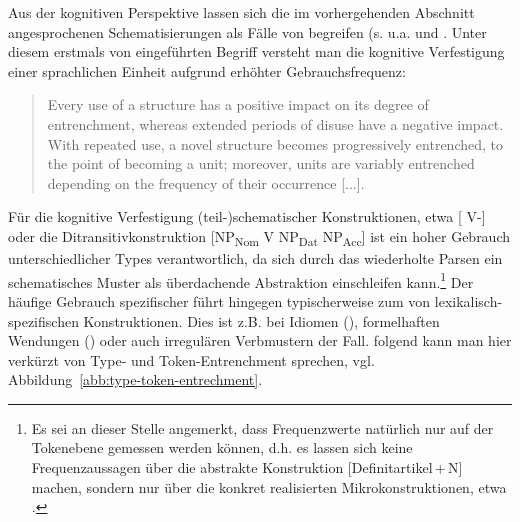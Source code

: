 \begin{sloppypar}Aus der kognitiven Perspektive lassen sich die im vorhergehenden Abschnitt angesprochenen Schematisierungen  als Fälle von  begreifen (s. u.a. \citealt{Langacker1987,Langacker2008,Goldberg1995,Goldberg2006,Bybee2006,Bybee2010} und \citealt{Schmid2007,Schmid2016}. 
Unter diesem erstmals von \citeauthor{Langacker1987} eingeführten Begriff versteht man die kognitive Verfestigung einer sprachlichen Einheit aufgrund erhöhter Gebrauchsfrequenz:\end{sloppypar}\blockcquote[59]{Langacker1987}{Every use of a structure has a positive impact on its degree of entrenchment, whereas extended periods of disuse have a negative impact. With repeated use, a novel structure becomes progressively entrenched, to the point of becoming a unit; moreover, units are variably entrenched depending on the frequency of their occurrence [...].} 

Für die kognitive Verfestigung (teil-)schematischer Konstruktionen, 
etwa [ V-] \parencite{Flick2016} oder  die Ditransitivkonstruktion   [NP\textsubscript{Nom} V NP\textsubscript{Dat} NP\textsubscript{Acc}] \parencite{Goldberg2006} ist ein hoher Gebrauch unterschiedlicher Types  verantwortlich, da sich durch das wiederholte Parsen ein schematisches Muster als überdachende Abstraktion einschleifen kann.\footnote{Es sei an dieser Stelle angemerkt, dass Frequenzwerte natürlich nur auf der Tokenebene  gemessen werden können, d.h. es lassen sich keine Frequenzaussagen über die abstrakte Konstruktion   [Definitartikel\,+\,N] machen, sondern nur über die konkret realisierten Mikrokonstruktionen, etwa .} 
Der häufige Gebrauch spezifischer  führt hingegen typischerweise zum  von lexikalisch-spe\-zi\-fisch\-en Konstruktionen. Dies ist z.B. bei Idiomen (), formelhaften Wendungen () oder auch irregulären Verbmustern der Fall. \textcite[103--104]{Ziem2013} folgend kann man hier verkürzt von Type- und Token-Entrenchment sprechen, vgl. Abbildung~\ref{abb:type-token-entrechment}.

